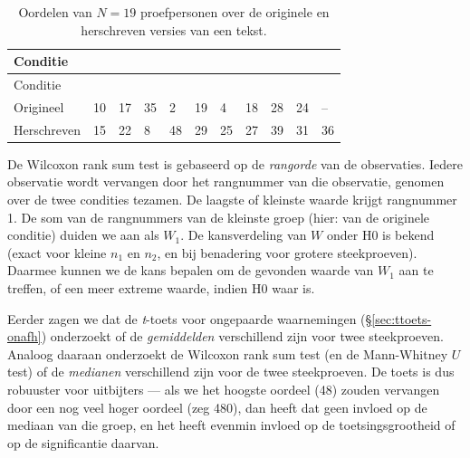 \documentclass[
]{book}
\begin{document}
\begin{longtable}[]{@{}lllllllllll@{}}
\caption{\label{tab:data-origineelherschreven} Oordelen van \(N=19\) proefpersonen over de originele en herschreven versies van een tekst.}\tabularnewline
\toprule\noalign{}
Conditie & & & & & & & & & & \\
\midrule\noalign{}
\endfirsthead
\toprule\noalign{}
Conditie & & & & & & & & & & \\
\midrule\noalign{}
\endhead
\bottomrule\noalign{}
\endlastfoot
Origineel & 10 & 17 & 35 & 2 & 19 & 4 & 18 & 28 & 24 & -- \\
Herschreven & 15 & 22 & 8 & 48 & 29 & 25 & 27 & 39 & 31 & 36 \\
\end{longtable}

De Wilcoxon rank sum test is gebaseerd op de \emph{rangorde} van de
observaties. Iedere observatie wordt vervangen door het rangnummer van
die observatie, genomen over de twee condities tezamen. De laagste of
kleinste waarde krijgt rangnummer 1. De som van de rangnummers van de
kleinste groep (hier: van de originele conditie) duiden we aan als
\(W_1\). De kansverdeling van \(W\) onder H0 is bekend (exact voor kleine
\(n_1\) en \(n_2\), en bij benadering voor grotere steekproeven). Daarmee
kunnen we de kans bepalen om de gevonden waarde van \(W_1\) aan te
treffen, of een meer extreme waarde, indien H0 waar is.

Eerder zagen we dat de \emph{t}-toets voor ongepaarde waarnemingen
(§\ref{sec:ttoets-onafh}) onderzoekt of de \emph{gemiddelden}
verschillend zijn voor twee steekproeven. Analoog daaraan onderzoekt de
Wilcoxon rank sum test (en de Mann-Whitney \(U\) test) of de \emph{medianen}
verschillend zijn voor de twee steekproeven. De toets is dus robuuster
voor uitbijters --- als we het hoogste oordeel (48) zouden vervangen
door een nog veel hoger oordeel (zeg 480), dan heeft dat geen invloed op
de mediaan van die groep, en het heeft evenmin invloed op de
toetsingsgrootheid of op de significantie daarvan.
\end{document}

